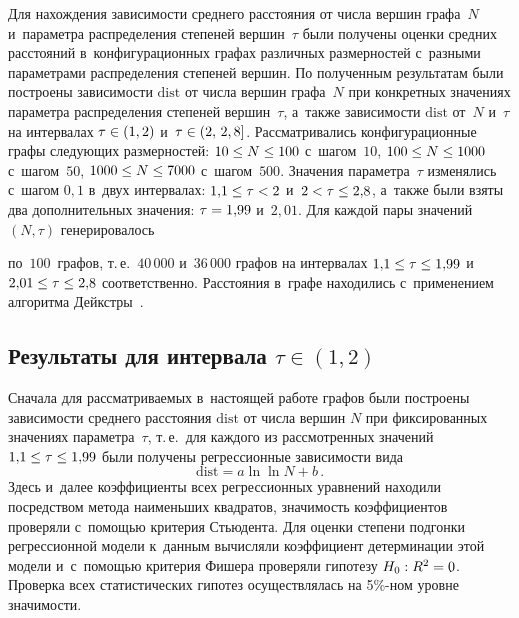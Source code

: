 \begin{multicols}{2}
Для нахождения зависимости среднего расстояния от числа вершин графа~$N$ и~па\-ра\-мет\-ра распределения
степеней вершин~$\tau$ были получены оценки средних расстояний в~конфигурационных графах различных
размерностей с~разными па\-ра\-мет\-ра\-ми распределения степеней вершин. По полученным результатам были
построены зависимости $\mathrm{dist}$ от чис\-ла вершин графа~$N$ при конкретных значениях па\-ра\-мет\-ра распределения
степеней вершин~$\tau$, а~также зависимости $\mathrm{dist}$ от~$N$ и~$\tau$ на интервалах $\tau\hm\in(1,2)$ и~$\tau\hm\in(2,\,2,8]$.
Рассматривались конфигурационные графы сле\-ду\-ющих размерностей:
$10\hm\leq N\hm\leq 100$ с~шагом~$10$, $100\hm\leq N\hm\leq 1000$ с~шагом~$50$, $1000\hm\leq N\hm\leq 7000$ с~шагом~$500$.
Значения параметра~$\tau$ изменялись с~шагом $0{,}1$ в~двух интервалах: $1{,}1\hm\leq\tau\hm<2$ и~$2\hm<\tau\hm\leq 2{,}8$,
а~так\-же были взяты два дополнительных значения: $\tau\hm=1{,}99$ и~$2{,}01$. Для
каждой пары значений $(N,\tau)$
генерировалось\linebreak\vspace*{-12pt}

\pagebreak

\noindent
  по~$100$~графов, т.\,е.\ $40\,000$ и~$36\,000$ графов на интервалах $1{,}1\hm\leq\tau\hm\leq 1{,}99$
и~$2{,}01\hm\leq\tau\hm\leq 2{,}8$ соответственно.
Расстояния в~графе находились с~применением алгоритма Дейкстры~\cite{Dijk}.

\subsection{Результаты для интервала $\tau\in(1,2)$}

Сначала для рассматриваемых в~настоящей работе графов были по\-стро\-ены зависимости среднего рас\-сто\-яния $\mathrm{dist}$ от
чис\-ла вершин $N$ при фиксированных значениях па\-ра\-мет\-ра~$\tau$, т.\,е.\ для каждого из рас\-смот\-рен\-ных значений
$1{,}1\hm\leq\tau\hm\leq 1{,}99$ были получены регрессионные зависимости вида
\begin{equation}
\label{eq4}
\mathrm{dist} = a \ln\ln N + b\,.
\end{equation}
Здесь и~далее коэффициенты всех регрессионных уравнений находили по\-средст\-вом метода наименьших
квадратов, зна\-чи\-мость коэффициентов проверяли с~помощью критерия Стьюдента. Для оценки степени подгонки
регрессионной модели к~данным вы\-чис\-ля\-ли коэффициент детерминации этой модели и~с~по\-мощью критерия Фишера
проверяли гипотезу $H_0: R^2\hm=0$. Проверка всех статистических гипотез осуществлялась на 5\%-ном уровне
зна\-чи\-мости.


\end{multicols}
